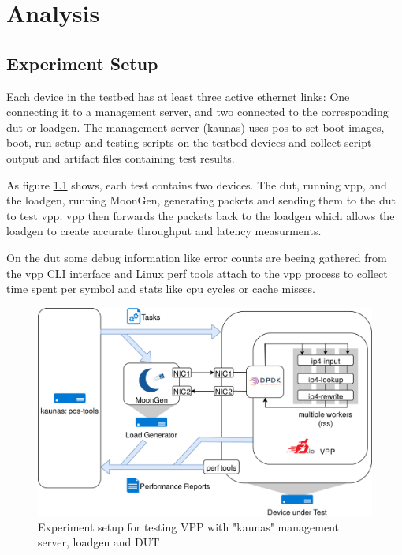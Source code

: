 
\chapter{Analysis}


\section{Experiment Setup}

Each device in the testbed has at least three active ethernet links:
One connecting it to a management server, and two connected to the
corresponding \Ac{dut} or \Ac{loadgen}. The management server (kaunas)
uses \Ac{pos} \cite{GallScho18} to set boot images, boot, run setup
and testing scripts on the testbed devices and collect script output
and artifact files containing test results.

As figure \ref{setup} shows, each test contains two devices. The
\Ac{dut}, running \Ac{vpp}, and the \Ac{loadgen}, running MoonGen,
generating packets and sending them to the \Ac{dut} to test \Ac{vpp}.
\Ac{vpp} then forwards the packets back to the \Ac{loadgen} which
allows the \Ac{loadgen} to create accurate throughput and latency
measurments.

On the \Ac{dut} some debug information like error counts are beeing
gathered from the \Ac{vpp} CLI interface and Linux perf tools
\cite{perf} attach to the vpp process to collect time spent per symbol
and stats like cpu cycles or cache misses.

\begin{figure}[!ht]
\noindent\hspace{0.5mm}\includegraphics[width=\linewidth]{pics/topology.png}
\caption{Experiment setup for testing VPP with "kaunas" management server, \Ac{loadgen} and DUT}
\label{setup}
\end{figure}


